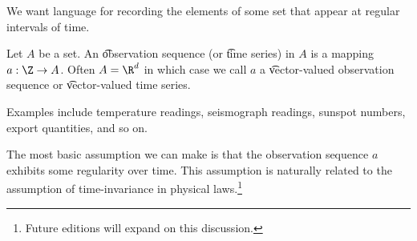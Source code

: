 

We want language for recording the elements of some set that appear at regular intervals of time.


Let $A$ be a set.
An \t{observation sequence} (or \t{time series}) in $A$ is a mapping $a: \Z \to A$.
Often $A = \R^d$ in which case we call $a$ a \t{vector-valued observation sequence} or \t{vector-valued time series}.


Examples include temperature readings, seismograph readings, sunspot numbers, export quantities, and so on.


The most basic assumption we can make is that the observation sequence $a$ exhibits some regularity over time.
This assumption is naturally related to the assumption of time-invariance in physical laws.\footnote{Future editions will expand on this discussion.}



\blankpage
